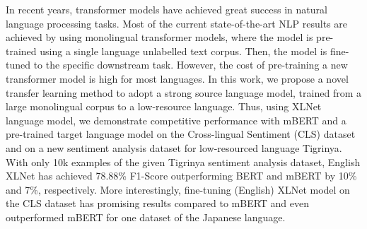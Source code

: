 In recent years, transformer models have achieved great success in natural language processing tasks. Most of the current state-of-the-art NLP results are achieved by using monolingual transformer models, where the model is pre-trained using a single language unlabelled text corpus. Then, the model is fine-tuned to the specific downstream task. However, the cost of pre-training a new transformer model is high for most languages. In this work, we propose a novel transfer learning method to adopt a strong source language model, trained from a large monolingual corpus to a low-resource language. Thus, using XLNet language model, we demonstrate competitive performance with mBERT and a pre-trained target language model on the Cross-lingual Sentiment (CLS) dataset and on a new sentiment analysis dataset for low-resourced language Tigrinya. With only 10k examples of the given Tigrinya sentiment analysis dataset, English XLNet has achieved 78.88\% F1-Score outperforming BERT and mBERT by 10\% and 7\%, respectively. More interestingly, fine-tuning (English) XLNet model on the CLS dataset has promising results compared to mBERT and even outperformed mBERT for one dataset of the Japanese language.
